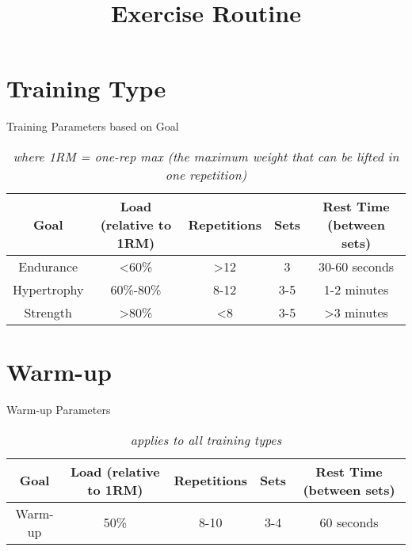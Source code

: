 \documentclass{article}
\title{Exercise Routine}
\author{}
\date{}
\begin{document}
    \maketitle

    \section{Training Type}

    \begin{table}[h!]
    \caption{Training Parameters based on Goal}
    \begin{center}
    \begin{tabular}{ |c|c|c|c|c| }
    \hline
    \textbf{Goal} & \textbf{Load (relative to 1RM)} & \textbf{Repetitions} & \textbf{Sets} & \textbf{Rest Time (between sets)} \\
    \hline
    Endurance & \textless{}60\% & \textgreater{}12 & 3 & 30-60 seconds \\
    \hline
    Hypertrophy & 60\%-80\% & 8-12 & 3-5 & 1-2 minutes \\
    \hline
    Strength & \textgreater{}80\% & \textless{}8 & 3-5 & \textgreater{}3 minutes \\
    \hline
    \end{tabular}
    \end{center}
    \caption*{\textit{where 1RM = one-rep max (the maximum weight that can be lifted in one repetition)}}
    \end{table}

    \section{Warm-up}

    \begin{table}[h!]
    \caption{Warm-up Parameters}
    \begin{center}
    \begin{tabular}{ |c|c|c|c|c| }
    \hline
    \textbf{Goal} & \textbf{Load (relative to 1RM)} & \textbf{Repetitions} & \textbf{Sets} & \textbf{Rest Time (between sets)} \\
    \hline
    Warm-up & 50\% & 8-10 & 3-4 & 60 seconds \\
    \hline
    \end{tabular}
    \end{center}
    \caption*{\textit{applies to all training types}}
    \end{table}

    \newpage
\end{document}
